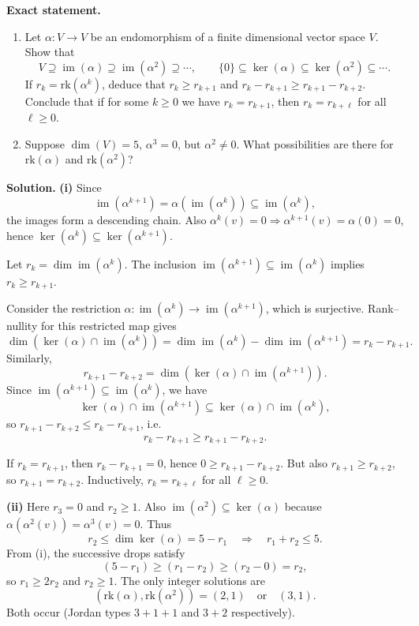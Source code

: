 \documentclass[12pt,a4paper]{article}
\theoremstyle{plain}
\theoremstyle{definition}      %
\begin{document}
\textbf{Exact statement.}
\begin{enumerate}
	\item[(i)] Let $\alpha:V\to V$ be an endomorphism of a finite dimensional vector space $V$.
	Show that
	\[
	V\supseteq \operatorname{im}(\alpha)\supseteq \operatorname{im}(\alpha^2)\supseteq \cdots,\qquad
	\{0\}\subseteq \ker(\alpha)\subseteq \ker(\alpha^2)\subseteq \cdots.
	\]
	If $r_k=\mathrm{rk}(\alpha^k)$, deduce that $r_k\ge r_{k+1}$ and
	$r_k-r_{k+1}\ge r_{k+1}-r_{k+2}$.
	Conclude that if for some $k\ge 0$ we have $r_k=r_{k+1}$, then $r_k=r_{k+\ell}$ for all $\ell\ge 0$.
	\item[(ii)] Suppose $\dim(V)=5$, $\alpha^3=0$, but $\alpha^2\ne 0$.
	What possibilities are there for $\mathrm{rk}(\alpha)$ and $\mathrm{rk}(\alpha^2)$?
\end{enumerate}

\textbf{Solution.}
\textbf{(i)} Since
\[
\operatorname{im}(\alpha^{k+1})=\alpha(\operatorname{im}(\alpha^k))\subseteq \operatorname{im}(\alpha^k),
\]
the images form a descending chain. Also $\alpha^k(v)=0\Rightarrow \alpha^{k+1}(v)=\alpha(0)=0$, hence
$\ker(\alpha^k)\subseteq \ker(\alpha^{k+1})$.

Let $r_k=\dim\operatorname{im}(\alpha^k)$. The inclusion
$\operatorname{im}(\alpha^{k+1})\subseteq \operatorname{im}(\alpha^k)$ implies $r_k\ge r_{k+1}$.

Consider the restriction $\alpha:\operatorname{im}(\alpha^k)\to \operatorname{im}(\alpha^{k+1})$, which is surjective.
Rank--nullity for this restricted map gives
\[
\dim(\ker(\alpha)\cap \operatorname{im}(\alpha^k))
=\dim\operatorname{im}(\alpha^k)-\dim\operatorname{im}(\alpha^{k+1})
=r_k-r_{k+1}.
\]
Similarly,
\[
r_{k+1}-r_{k+2}=\dim(\ker(\alpha)\cap \operatorname{im}(\alpha^{k+1})).
\]
Since $\operatorname{im}(\alpha^{k+1})\subseteq \operatorname{im}(\alpha^k)$, we have
\[
\ker(\alpha)\cap \operatorname{im}(\alpha^{k+1})\subseteq \ker(\alpha)\cap \operatorname{im}(\alpha^k),
\]
so $r_{k+1}-r_{k+2}\le r_k-r_{k+1}$, i.e.
\[
r_k-r_{k+1}\ge r_{k+1}-r_{k+2}.
\]

If $r_k=r_{k+1}$, then $r_k-r_{k+1}=0$, hence $0\ge r_{k+1}-r_{k+2}$.
But also $r_{k+1}\ge r_{k+2}$, so $r_{k+1}=r_{k+2}$. Inductively, $r_k=r_{k+\ell}$ for all $\ell\ge 0$.

\medskip
\textbf{(ii)} Here $r_3=0$ and $r_2\ge 1$.
Also $\operatorname{im}(\alpha^2)\subseteq \ker(\alpha)$ because $\alpha(\alpha^2(v))=\alpha^3(v)=0$.
Thus
\[
r_2\le \dim\ker(\alpha)=5-r_1 \quad\Rightarrow\quad r_1+r_2\le 5.
\]
From (i), the successive drops satisfy
\[
(5-r_1)\ge (r_1-r_2)\ge (r_2-0)=r_2,
\]
so $r_1\ge 2r_2$ and $r_2\ge 1$.
The only integer solutions are
\[
(\mathrm{rk}(\alpha),\mathrm{rk}(\alpha^2))=(2,1)\quad\text{or}\quad(3,1).
\]
Both occur (Jordan types $3+1+1$ and $3+2$ respectively).
\end{document}
